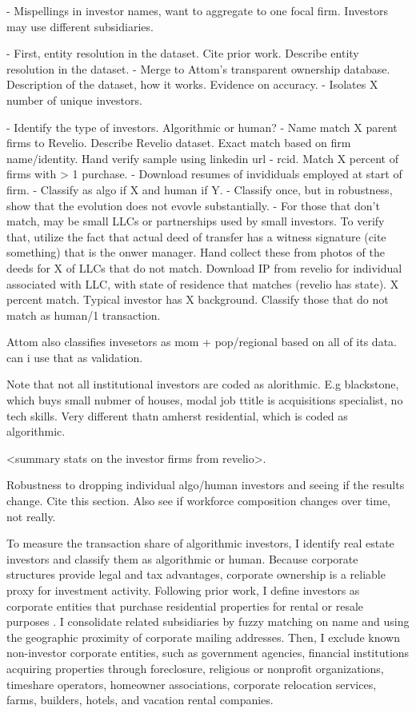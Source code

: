 \documentclass[11pt]{article}
\begin{document}
- Mispellings in investor names, want to aggregate to one focal firm. Investors may use different subsidiaries. 

- First, entity resolution in the dataset. Cite prior work. Describe entity resolution in the dataset. 
- Merge to Attom's transparent ownership database. Description of the dataset, how it works. Evidence on accuracy. 
- Isolates X number of unique investors. 

- Identify the type of investors. Algorithmic or human?
- Name match X parent firms to Revelio. Describe Revelio dataset. Exact match based on firm name/identity. Hand verify sample using linkedin url - rcid. Match X percent of firms with > 1 purchase. 
- Download resumes of invididuals employed at start of firm. 
- Classify as algo if X and human if Y. 
- Classify once, but in robustness, show that the evolution does not evovle substantially. 
- For those that don't match, may be small LLCs or partnerships used by small investors. To verify that, utilize the fact that actual deed of transfer has a witness signature (cite something) that is the onwer manager. Hand collect these from photos of the deeds for X of LLCs that do not match. Download IP from revelio for individual associated with LLC, with state of residence that matches (revelio has state). X percent match. Typical investor has X background. Classify those that do not match as human/1 transaction. 

Attom also classifies invesetors as mom + pop/regional based on all of its data. can i use that as validation. 

Note that not all institutional investors are coded as alorithmic. E.g blackstone, which buys small nubmer of houses, modal job ttitle is acquisitions specialist, no tech skills. Very different thatn amherst residential, which is coded as algorithmic. 

<summary stats on the investor firms from revelio>. 

Robustness to dropping individual algo/human investors and seeing if the results change. Cite this section. Also see if workforce composition changes over time, not really. 



To measure the transaction share of algorithmic investors, I identify real estate investors and classify them as algorithmic or human. Because corporate structures provide legal and tax advantages, corporate ownership is a reliable proxy for investment activity. Following prior work, I define investors as corporate entities that purchase residential properties for rental or resale purposes \citep{RedfinInvestorHomePurchases, millsLargeScaleBuy2019}. I consolidate related subsidiaries by fuzzy matching on name and using the geographic proximity of corporate mailing addresses. Then, I exclude known non-investor corporate entities, such as government agencies, financial institutions acquiring properties through foreclosure, religious or nonprofit organizations, timeshare operators, homeowner associations, corporate relocation services, farms, builders, hotels, and vacation rental companies.
\end{document}
